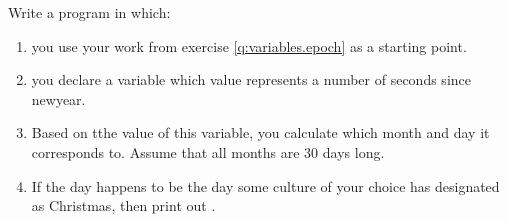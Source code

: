 Write a program in which:

\begin{enumerate}
  \item you use your work from exercise \ref{q:variables.epoch} as a starting point.
  \item you declare a variable which value represents a number of seconds since newyear.
  \item Based on tthe value of this variable, you calculate which month and day it corresponds to. Assume that all months are 30 days long.
  \item If the day happens to be the day some culture of your choice has designated as Christmas, then print out .
\end{enumerate}
